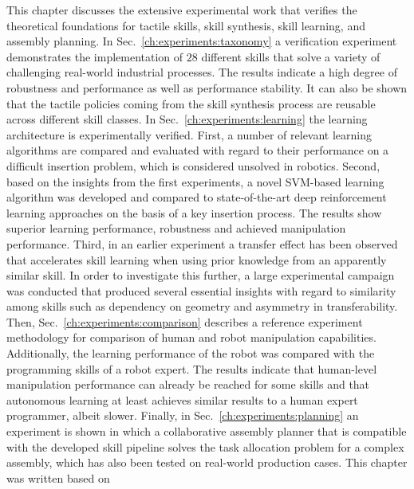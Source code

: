 This chapter discusses the extensive experimental work that verifies the theoretical foundations for tactile skills, skill synthesis, skill learning, and assembly planning.
In Sec.~\ref{ch:experiments:taxonomy} a verification experiment demonstrates the implementation of $28$ different skills that solve a variety of challenging real-world industrial processes.
The results indicate a high degree of robustness and performance as well as performance stability.
It can also be shown that the tactile policies coming from the skill synthesis process are reusable across different skill classes.
In Sec.~\ref{ch:experiments:learning} the learning architecture is experimentally verified.
First, a number of relevant learning algorithms are compared and evaluated with regard to their performance on a difficult insertion problem, which is considered unsolved in robotics.
Second, based on the insights from the first experiments, a novel SVM-based learning algorithm was developed and compared to state-of-the-art deep reinforcement learning approaches on the basis of a key insertion process.
The results show superior learning performance, robustness and achieved manipulation performance.
Third, in an earlier experiment a transfer effect has been observed that accelerates skill learning when using prior knowledge from an apparently similar skill.
In order to investigate this further, a large experimental campaign was conducted that produced several essential insights with regard to similarity among skills such as dependency on geometry and asymmetry in transferability.
Then, Sec.~\ref{ch:experiments:comparison} describes a reference experiment methodology for comparison of human and robot manipulation capabilities. Additionally, the learning performance of the robot was compared with the programming skills of a robot expert.
The results indicate that human-level manipulation performance can already be reached for some skills and that autonomous learning at least achieves similar results to a human expert programmer, albeit slower.
Finally, in Sec.~\ref{ch:experiments:planning} an experiment is shown in which a collaborative assembly planner that is compatible with the developed skill pipeline solves the task allocation problem for a complex assembly, which has also been tested on real-world production cases.
This chapter was written based on \cite{Johannsmeier.2017,Johannsmeier.2019,Voigt.2021,Johannsmeier.2022,Johannsmeier.2023,Johannsmeier.2023b}